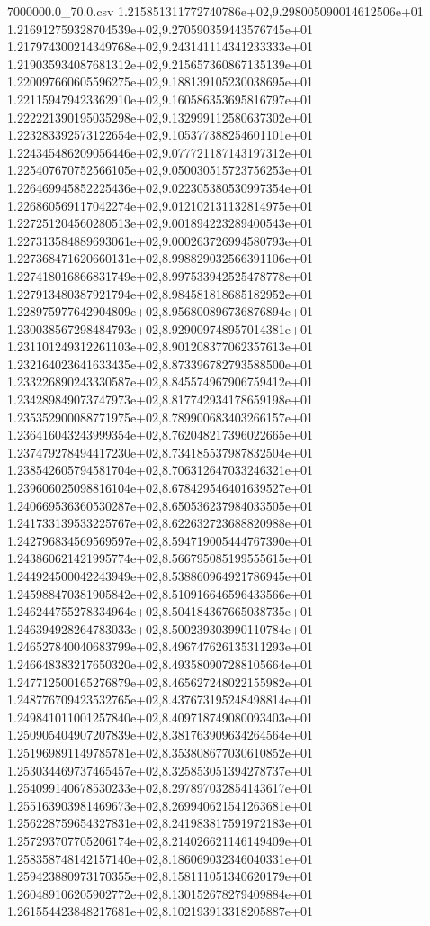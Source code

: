 \begin{filecontents*}{7000000.0_70.0.csv}
1.215851311772740786e+02,9.298005090014612506e+01
1.216912759328704539e+02,9.270590359443576745e+01
1.217974300214349768e+02,9.243141114341233333e+01
1.219035934087681312e+02,9.215657360867135139e+01
1.220097660605596275e+02,9.188139105230038695e+01
1.221159479423362910e+02,9.160586353695816797e+01
1.222221390195035298e+02,9.132999112580637302e+01
1.223283392573122654e+02,9.105377388254601101e+01
1.224345486209056446e+02,9.077721187143197312e+01
1.225407670752566105e+02,9.050030515723756253e+01
1.226469945852225436e+02,9.022305380530997354e+01
1.226860569117042274e+02,9.012102131132814975e+01
1.227251204560280513e+02,9.001894223289400543e+01
1.227313584889693061e+02,9.000263726994580793e+01
1.227368471620660131e+02,8.998829032566391106e+01
1.227418016866831749e+02,8.997533942525478778e+01
1.227913480387921794e+02,8.984581818685182952e+01
1.228975977642904809e+02,8.956800896736876894e+01
1.230038567298484793e+02,8.929009748957014381e+01
1.231101249312261103e+02,8.901208377062357613e+01
1.232164023641633435e+02,8.873396782793588500e+01
1.233226890243330587e+02,8.845574967906759412e+01
1.234289849073747973e+02,8.817742934178659198e+01
1.235352900088771975e+02,8.789900683403266157e+01
1.236416043243999354e+02,8.762048217396022665e+01
1.237479278494417230e+02,8.734185537987832504e+01
1.238542605794581704e+02,8.706312647033246321e+01
1.239606025098816104e+02,8.678429546401639527e+01
1.240669536360530287e+02,8.650536237984033505e+01
1.241733139533225767e+02,8.622632723688820988e+01
1.242796834569569597e+02,8.594719005444767390e+01
1.243860621421995774e+02,8.566795085199555615e+01
1.244924500042243949e+02,8.538860964921786945e+01
1.245988470381905842e+02,8.510916646596433566e+01
1.246244755278334964e+02,8.504184367665038735e+01
1.246394928264783033e+02,8.500239303990110784e+01
1.246527840040683799e+02,8.496747626135311293e+01
1.246648383217650320e+02,8.493580907288105664e+01
1.247712500165276879e+02,8.465627248022155982e+01
1.248776709423532765e+02,8.437673195248498814e+01
1.249841011001257840e+02,8.409718749080093403e+01
1.250905404907207839e+02,8.381763909634264564e+01
1.251969891149785781e+02,8.353808677030610852e+01
1.253034469737465457e+02,8.325853051394278737e+01
1.254099140678530233e+02,8.297897032854143617e+01
1.255163903981469673e+02,8.269940621541263681e+01
1.256228759654327831e+02,8.241983817591972183e+01
1.257293707705206174e+02,8.214026621146149409e+01
1.258358748142157140e+02,8.186069032346040331e+01
1.259423880973170355e+02,8.158111051340620179e+01
1.260489106205902772e+02,8.130152678279409884e+01
1.261554423848217681e+02,8.102193913318205887e+01

\end{filecontents*}
